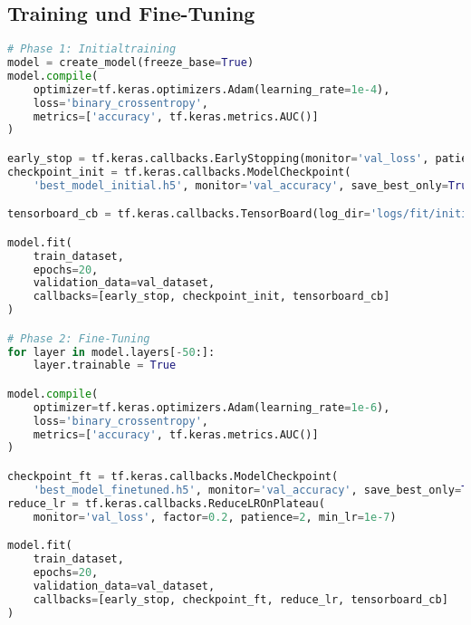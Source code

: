 \subsection{Training und Fine-Tuning}
\begin{lstlisting}[language=Python, caption=Training‐Loop aus \texttt{train\_model.py}]
# Phase 1: Initialtraining
model = create_model(freeze_base=True)
model.compile(
    optimizer=tf.keras.optimizers.Adam(learning_rate=1e-4),
    loss='binary_crossentropy',
    metrics=['accuracy', tf.keras.metrics.AUC()]
)

early_stop = tf.keras.callbacks.EarlyStopping(monitor='val_loss', patience=10, restore_best_weights=True)
checkpoint_init = tf.keras.callbacks.ModelCheckpoint(
    'best_model_initial.h5', monitor='val_accuracy', save_best_only=True)

tensorboard_cb = tf.keras.callbacks.TensorBoard(log_dir='logs/fit/initial', update_freq='epoch')

model.fit(
    train_dataset,
    epochs=20,
    validation_data=val_dataset,
    callbacks=[early_stop, checkpoint_init, tensorboard_cb]
)

# Phase 2: Fine-Tuning
for layer in model.layers[-50:]:
    layer.trainable = True

model.compile(
    optimizer=tf.keras.optimizers.Adam(learning_rate=1e-6),
    loss='binary_crossentropy',
    metrics=['accuracy', tf.keras.metrics.AUC()]
)

checkpoint_ft = tf.keras.callbacks.ModelCheckpoint(
    'best_model_finetuned.h5', monitor='val_accuracy', save_best_only=True)
reduce_lr = tf.keras.callbacks.ReduceLROnPlateau(
    monitor='val_loss', factor=0.2, patience=2, min_lr=1e-7)

model.fit(
    train_dataset,
    epochs=20,
    validation_data=val_dataset,
    callbacks=[early_stop, checkpoint_ft, reduce_lr, tensorboard_cb]
)
\end{lstlisting}
